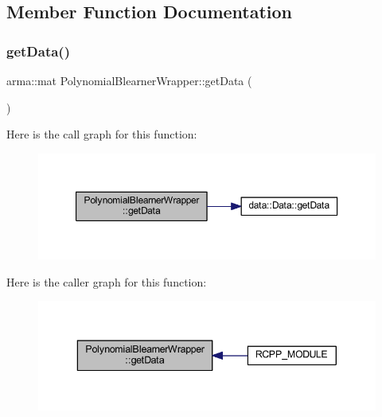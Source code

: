 \subsection{Member Function Documentation}
\mbox{\label{class_polynomial_blearner_wrapper_a56c92d1dee5e610657437766c13a6a5d}} 
\subsubsection{\texorpdfstring{get\+Data()}{getData()}}
{\footnotesize\ttfamily arma\+::mat Polynomial\+Blearner\+Wrapper\+::get\+Data (\begin{DoxyParamCaption}{ }\end{DoxyParamCaption})\hspace{0.3cm}{\ttfamily [inline]}}

Here is the call graph for this function\+:
\nopagebreak
\begin{figure}[H]
\begin{center}
\leavevmode
\includegraphics[width=350pt]{class_polynomial_blearner_wrapper_a56c92d1dee5e610657437766c13a6a5d_cgraph}
\end{center}
\end{figure}
Here is the caller graph for this function\+:\nopagebreak
\begin{figure}[H]
\begin{center}
\leavevmode
\includegraphics[width=343pt]{class_polynomial_blearner_wrapper_a56c92d1dee5e610657437766c13a6a5d_icgraph}
\end{center}
\end{figure}
\mbox{\label{class_polynomial_blearner_wrapper_a40ee4c7ab2c7230d96577d3a588b262f}} 
